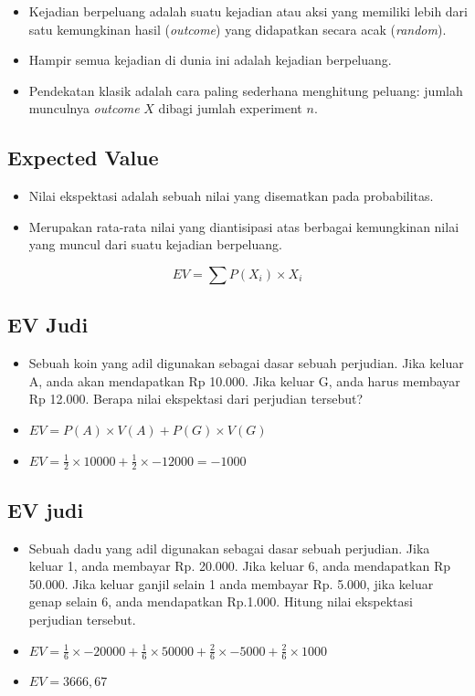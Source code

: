 \documentclass[
  letterpaper,
  DIV=11,
  numbers=noendperiod]{scrartcl}
\begin{document}
\begin{itemize}
\item
  Kejadian berpeluang adalah suatu kejadian atau aksi yang memiliki
  lebih dari satu kemungkinan hasil (\emph{outcome}) yang didapatkan
  secara acak (\emph{random}).
\item
  Hampir semua kejadian di dunia ini adalah kejadian berpeluang.
\item
  Pendekatan klasik adalah cara paling sederhana menghitung peluang:
  jumlah munculnya \emph{outcome} \(X\) dibagi jumlah experiment \(n\).
\end{itemize}

\subsection{Expected Value}\label{expected-value}

\begin{itemize}
\item
  Nilai ekspektasi adalah sebuah nilai yang disematkan pada
  probabilitas.
\item
  Merupakan rata-rata nilai yang diantisipasi atas berbagai kemungkinan
  nilai yang muncul dari suatu kejadian berpeluang.
\end{itemize}

\[
EV=\sum P(X_i) \times X_i
\]

\subsection{EV Judi}\label{ev-judi}

\begin{itemize}
\item
  Sebuah koin yang adil digunakan sebagai dasar sebuah perjudian. Jika
  keluar A, anda akan mendapatkan Rp 10.000. Jika keluar G, anda harus
  membayar Rp 12.000. Berapa nilai ekspektasi dari perjudian tersebut?
\item
  \(EV=P(A) \times V(A) + P(G) \times V(G)\)
\item
  \(EV=\frac{1}{2} \times 10000 + \frac{1}{2} \times -12000=-1000\)
\end{itemize}

\subsection{EV judi}\label{ev-judi-1}

\begin{itemize}
\item
  Sebuah dadu yang adil digunakan sebagai dasar sebuah perjudian. Jika
  keluar 1, anda membayar Rp. 20.000. Jika keluar 6, anda mendapatkan Rp
  50.000. Jika keluar ganjil selain 1 anda membayar Rp. 5.000, jika
  keluar genap selain 6, anda mendapatkan Rp.1.000. Hitung nilai
  ekspektasi perjudian tersebut.
\item
  \(EV=\frac{1}{6} \times -20000 + \frac{1}{6} \times 50000 + \frac{2}{6} \times -5000 + \frac{2}{6}\times 1000\)
\item
  \(EV=3666,67\)
\end{itemize}
\end{document}
